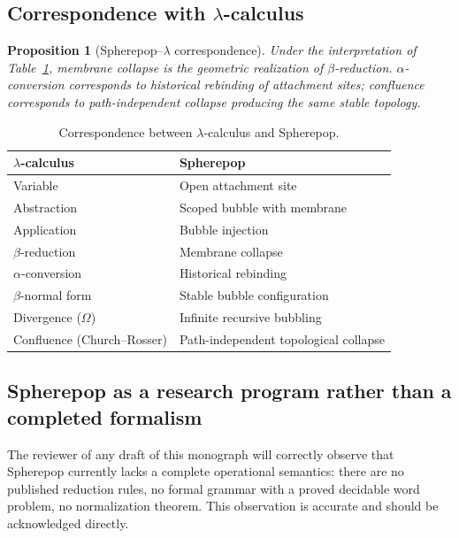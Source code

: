 \documentclass[12pt, a4paper]{article}
\theoremstyle{plain}
\newtheorem{proposition}[theorem]{Proposition}
\theoremstyle{definition}
\theoremstyle{remark}
\begin{document}
\subsection{Correspondence with $\lambda$-calculus}

\begin{proposition}[Spherepop--$\lambda$ correspondence]
  Under the interpretation of Table~\ref{tab:lambda-spherepop},
  membrane collapse is the geometric realization of $\beta$-reduction.
  $\alpha$-conversion corresponds to historical rebinding of attachment
  sites; confluence corresponds to path-independent collapse producing
  the same stable topology.
\end{proposition}

\begin{table}[h!]
\centering
\caption{Correspondence between $\lambda$-calculus and Spherepop.}
\label{tab:lambda-spherepop}
\begin{tabular}{ll}
\toprule
\textbf{$\lambda$-calculus} & \textbf{Spherepop} \\
\midrule
Variable          & Open attachment site \\
Abstraction       & Scoped bubble with membrane \\
Application       & Bubble injection \\
$\beta$-reduction & Membrane collapse \\
$\alpha$-conversion & Historical rebinding \\
$\beta$-normal form & Stable bubble configuration \\
Divergence ($\Omega$) & Infinite recursive bubbling \\
Confluence (Church--Rosser) & Path-independent topological collapse \\
\bottomrule
\end{tabular}
\end{table}

\subsection{Spherepop as a research program rather than a completed formalism}

The reviewer of any draft of this monograph will correctly observe that
Spherepop currently lacks a complete operational semantics: there are no
published reduction rules, no formal grammar with a proved decidable
word problem, no normalization theorem.
This observation is accurate and should be acknowledged directly.
\end{document}
